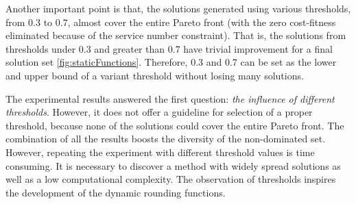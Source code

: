 \documentclass[10pt,journal,compsoc]{IEEEtran}
\begin{document}

Another important point is that, the solutions generated using various thresholds, from 0.3 to 0.7, almost cover the entire Pareto front (with the zero cost-fitness eliminated because of the service number constraint). That is, the solutions from thresholds under 0.3 and greater than 0.7 have trivial improvement for a final solution set \ref{fig:staticFunctions}.
Therefore, 0.3 and 0.7 can be set as the lower and upper bound of a variant threshold without losing many solutions.

The experimental results answered the first question: \textit{the influence of different thresholds}. 
However, it does not offer a guideline for selection of a proper threshold, because none of the solutions could cover the entire Pareto front.
The combination of all the results boosts the diversity of the non-dominated set. However, repeating the experiment with different threshold values is time consuming. It is necessary to discover a method with widely spread solutions as well as a low computational complexity.
The observation of thresholds inspires the development of the dynamic rounding functions.
\end{document}
